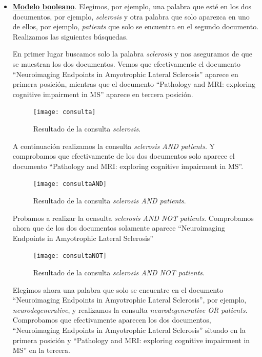 \documentclass[size=a4, parskip=half, titlepage=false, toc=flat, toc=bib, 12pt]{scrartcl}
\theoremstyle{theorem-style}
\theoremstyle{definition-style}
\theoremstyle{remark-style}
\theoremstyle{example-style}
\theoremstyle{definition-style}
\theoremstyle{remark-style}
\begin{document}
\begin{itemize}
\item \textbf{\underline{Modelo booleano}}. Elegimos, por ejemplo, una palabra que esté en los dos documentos, por ejemplo, \textit{sclerosis} y otra palabra que solo aparezca en uno de ellos, por ejemplo, \textit{patients} que solo se encuentra en el segundo documento. Realizamos las siguientes búsquedas.

En primer lugar buscamos solo la palabra \textit{sclerosis} y nos aseguramos de que se muestran los dos documentos. Vemos que efectivamente el documento ``Neuroimaging Endpoints in Amyotrophic Lateral Sclerosis'' aparece en primera posición, mientras que el documento ``Pathology and MRI: exploring cognitive impairment in MS'' aparece en tercera posición.

\begin{figure}[H]
\centering
\texttt{[image: consulta]}
\caption{Resultado de la consulta \textit{sclerosis}.}
\label{errorcomillas}
\end{figure}

A continuación realizamos la consulta \textit{sclerosis AND patients}. Y comprobamos que efectivamente de los dos documentos solo aparece el documento ``Pathology and MRI: exploring cognitive impairment in MS''.

\begin{figure}[H]
\centering
\texttt{[image: consultaAND]}
\caption{Resultado de la consulta \textit{sclerosis AND patients}.}
\label{errorcomillas}
\end{figure}

Probamos a realizar la ocnsulta \textit{sclerosis AND NOT patients}. Comprobamos ahora que de los dos documentos solamente aparece ``Neuroimaging Endpoints in Amyotrophic Lateral Sclerosis''

\begin{figure}[H]
\centering
\texttt{[image: consultaNOT]}
\caption{Resultado de la consulta \textit{sclerosis AND NOT patients}.}
\label{errorcomillas}
\end{figure}

Elegimos ahora una palabra que solo se encuentre en el documento ``Neuroimaging Endpoints in Amyotrophic Lateral Sclerosis'', por ejemplo, \textit{neurodegenerative}, y realizamos la consulta \textit{neurodegenerative OR patients}. Comprobamos que efectivamente aparecen los dos documentos, ``Neuroimaging Endpoints in Amyotrophic Lateral Sclerosis'' situado en la primera posición y ``Pathology and MRI: exploring cognitive impairment in MS'' en la tercera.


\end{itemize}
\end{document}
